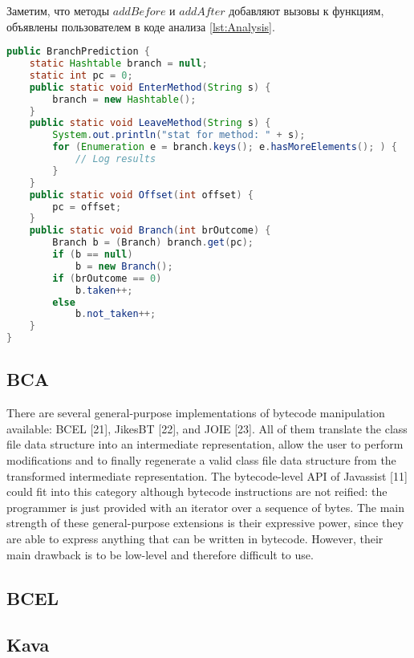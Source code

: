 Заметим, что методы $addBefore$ и $addAfter$ добавляют вызовы к функциям, объявлены пользователем в коде анализа \autoref{lst:Analysis}.

\begin{lstlisting}[language=Java, caption=Подсчет условных переходов на $BIT$. Код анализа, label=lst:Analysis]
public BranchPrediction {
    static Hashtable branch = null;
    static int pc = 0;
    public static void EnterMethod(String s) {
        branch = new Hashtable();
    }
    public static void LeaveMethod(String s) {
        System.out.println("stat for method: " + s);
        for (Enumeration e = branch.keys(); e.hasMoreElements(); ) {
            // Log results
        }
    }
    public static void Offset(int offset) {
        pc = offset;
    }
    public static void Branch(int brOutcome) {
        Branch b = (Branch) branch.get(pc);
        if (b == null)
            b = new Branch();
        if (brOutcome == 0)
            b.taken++;
        else
            b.not_taken++;
    }
}
\end{lstlisting}

\subsection{BCA}

\cite{bca}


There are several general-purpose implementations of bytecode manipulation
available: BCEL [21], JikesBT [22], and JOIE [23]. All of them translate the
class file data structure into an intermediate representation, allow the user to
perform modifications and to finally regenerate a valid class file data structure
from the transformed intermediate representation. The bytecode-level API of
Javassist [11] could fit into this category although bytecode instructions are not
reified: the programmer is just provided with an iterator over a sequence of
bytes. The main strength of these general-purpose extensions is their expressive
power, since they are able to express anything that can be written in bytecode.
However, their main drawback is to be low-level and therefore difficult to use.

\subsection{BCEL}


\subsection{Kava}

